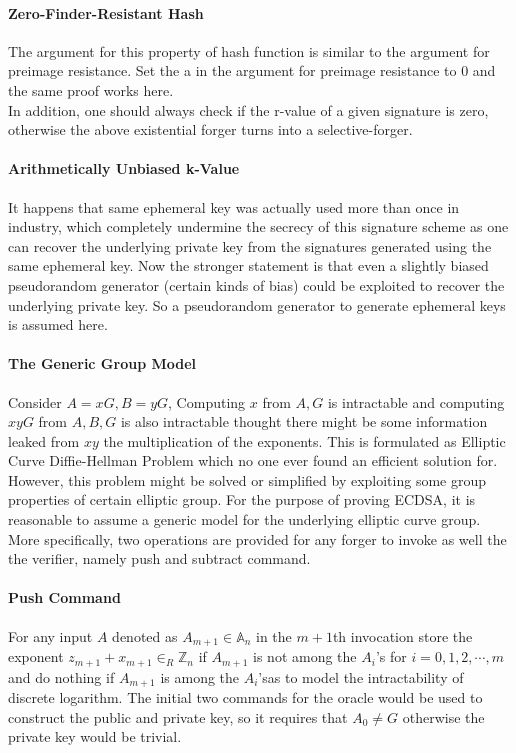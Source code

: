\documentclass[18]{article}
\begin{document}
\paragraph{Zero-Finder-Resistant Hash} The argument for this property of hash function is similar to the argument for preimage resistance. Set the a in the argument for preimage resistance to 0 and the same proof works here.\\

In addition, one should always check if the r-value of a given signature is zero, otherwise the above existential forger turns into a selective-forger.

\paragraph{Arithmetically Unbiased k-Value}
It happens that same ephemeral key was actually used more than once in industry, which completely undermine the secrecy of this signature scheme as one can recover the underlying private key from the signatures generated using the same ephemeral key.
Now the stronger statement is that even a slightly biased pseudorandom generator (certain kinds of bias) could be exploited to recover the underlying private key.
So a pseudorandom generator to generate ephemeral keys is assumed here.

\paragraph{The Generic Group Model}
Consider $A=xG,B=yG$, Computing $x$ from $A,G$ is intractable and computing $xyG$ from $A,B,G$ is also intractable thought there might be some information leaked from $xy$ the multiplication of the exponents. This is formulated as Elliptic Curve Diffie-Hellman Problem which no one ever found an efficient solution for. However, this problem might be solved or simplified by exploiting some group properties of certain elliptic group. For the purpose of proving ECDSA, it is reasonable to assume a generic model for the underlying elliptic curve group. More specifically, two operations are provided for any forger to invoke as well the the verifier, namely push and subtract command.\\
\paragraph{Push Command}
For any input $A$ denoted as $A_{m+1}\in \mathbb{A}_n$ in the $m+1$th invocation store the exponent $z_{m+1}+x_{m+1}\in_R\mathbb{Z}_n$ if $A_{m+1}$ is not among the $A_i$'s for $i=0,1,2,\cdots,m$ and do nothing if $A_{m+1}$ is among the $A_i$'sas to model the intractability of discrete logarithm. The initial two commands for the oracle would be used to construct the public and private key, so it requires that $A_0\neq G$ otherwise the private key would be trivial.
\end{document}
